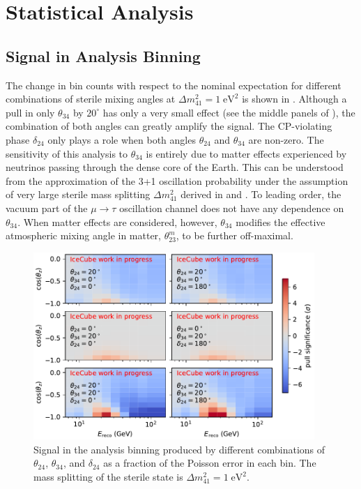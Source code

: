 \section{Statistical Analysis}

\subsection{Signal in Analysis Binning}
The change in bin counts with respect to the nominal expectation for different combinations of sterile mixing angles at $\Delta m^2_{41}=1\;\mathrm{eV^2}$ is shown in .
Although a pull in only $\theta_{34}$ by $20^\circ$ has only a very small effect (see the middle panels of ), the combination of both angles can greatly amplify the signal.
The CP-violating phase $\delta_{24}$ only plays a role when both angles $\theta_{24}$ and $\theta_{34}$ are non-zero.
The sensitivity of this analysis to $\theta_{34}$ is entirely due to matter effects experienced by neutrinos passing through the dense core of the Earth.
This can be understood from the approximation of the 3+1 oscillation probability under the assumption of very large sterile mass splitting $\Delta m^2_{41}$ derived in  and . To leading order, the vacuum part of the $\mu\rightarrow\tau$ oscillation channel does not have any dependence on $\theta_{34}$. When matter effects are considered, however, $\theta_{34}$ modifies the effective atmospheric mixing angle in matter, $\theta_{23}^m$, to be further off-maximal.

\begin{figure}
    \centering
    \includegraphics[width=0.95\textwidth]{figures/measurement/sterile_analysis/oscillation_signal/pull_theta_combinations_20deg_dcp24.pdf}
    \caption{Signal in the analysis binning produced by different combinations of $\theta_{24}$, $\theta_{34}$, and $\delta_{24}$ as a fraction of the Poisson error in each bin. The mass splitting of the sterile state is $\Delta m^2_{41}=1\;\mathrm{eV^2}$.}
    \label{fig:oscillation-effects-ana-binning}
\end{figure}

